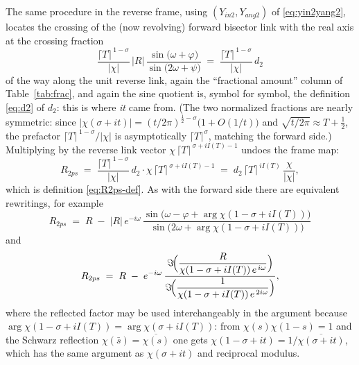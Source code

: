 \documentclass[11pt]{article}
\theoremstyle{definition}
\begin{document}
The same procedure in the reverse frame, using
$(Y_{in2},Y_{ang2})$ of \eqref{eq:yin2yang2}, locates the crossing of the
(now revolving) forward bisector link with the real axis at the crossing fraction
\begin{equation}\label{eq:frac2}
\frac{\lceil T\rceil^{\,1-\sigma}}{|\chi|}\,
|R|\,\frac{\sin\!\bigl(\omega+\varphi\bigr)}{\sin\!\bigl(2\omega+\psi\bigr)}
\;=\;
\frac{\lceil T\rceil^{\,1-\sigma}}{|\chi|}\, d_2
\end{equation}
of the way along the unit reverse link, again the ``fractional amount''
column of Table~\ref{tab:frac}, and again the sine quotient is, symbol for
symbol, the definition \eqref{eq:d2} of $d_2$: this is where \emph{it} came
from. (The two normalized fractions are nearly symmetric: since
$|\chi(\sigma+it)|=(t/2\pi)^{\frac12-\sigma}\bigl(1+O(1/t)\bigr)$ and
$\sqrt{t/2\pi}\approx T+\tfrac12$, the prefactor
$\lceil T\rceil^{\,1-\sigma}/|\chi|$ is asymptotically
$\lceil T\rceil^{\sigma}$, matching the forward side.) Multiplying by the
reverse link vector $\chi\,\lceil T\rceil^{\,\sigma+iI(T)-1}$ undoes the
frame map:
\begin{equation}\label{eq:R2-derived}
R_{2ps}
\;=\;
\frac{\lceil T\rceil^{\,1-\sigma}}{|\chi|}\,d_2
\cdot \chi\,\lceil T\rceil^{\,\sigma+iI(T)-1}
\;=\;
d_2\,\lceil T\rceil^{\,iI(T)}\,\frac{\chi}{|\chi|},
\end{equation}
which is definition \eqref{eq:R2ps-def}. As with the forward side there are
equivalent rewritings, for example
\begin{equation}\label{eq:R2-other-a}
R_{2ps}
\;=\;
R \;-\; |R|\,e^{-i\omega}\,
\frac{\sin\!\bigl(\omega-\varphi+\arg\chi(1-\sigma+iI(T))\bigr)}
     {\sin\!\bigl(2\omega+\arg\chi(1-\sigma+iI(T))\bigr)}
\end{equation}
and
\begin{equation}\label{eq:R2-other-b}
R_{2ps}
\;=\;
R \;-\; e^{-i\omega}\,
\frac{\Im\!\Bigl(\dfrac{R}{\chi(1-\sigma+iI(T))\,e^{\,i\omega}}\Bigr)}
     {\Im\!\Bigl(\dfrac{1}{\chi(1-\sigma+iI(T))\,e^{\,2i\omega}}\Bigr)},
\end{equation}
where the reflected factor may be used interchangeably in the argument because
$\arg\chi(1-\sigma+iI(T))=\arg\chi(\sigma+iI(T))$: from
$\chi(s)\chi(1-s)=1$ and the Schwarz reflection
$\chi(\bar s)=\overline{\chi(s)}$ one gets
$\chi(1-\sigma+it)=1/\overline{\chi(\sigma+it)}$, which has the same
argument as $\chi(\sigma+it)$ and reciprocal modulus.
\end{document}
